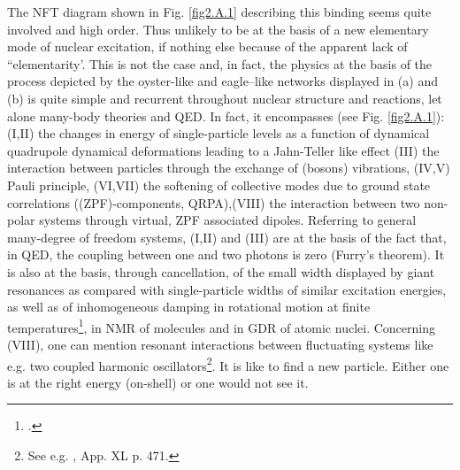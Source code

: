 \begin{subappendices}
The NFT diagram shown in Fig. \ref{fig2.A.1} describing this binding seems quite involved and high order. Thus unlikely to be at the basis of a new elementary mode of nuclear excitation, if nothing else because of the apparent lack of ``elementarity'. This is not the case and, in fact, the physics at the basis of the process depicted by the oyster-like and eagle--like networks displayed in (a) and (b) is quite simple and recurrent throughout nuclear structure and reactions, let alone many-body theories and QED. In fact, it encompasses (see Fig. \ref{fig2.A.1}): (I,II) the changes in energy of single-particle levels as a function of dynamical quadrupole dynamical deformations leading to a Jahn-Teller like effect (III) the interaction between particles through the exchange of (bosons) vibrations, (IV,V) Pauli principle, (VI,VII) the softening of collective modes due to ground state correlations ((ZPF)-components, QRPA),(VIII) the interaction between two non-polar systems through virtual, ZPF associated dipoles. Referring to general many-degree of freedom systems, (I,II) and (III) are at the basis of the fact that, in QED, the coupling between one and two photons is zero (Furry's theorem). It is also at the basis, through cancellation, of the small width displayed by giant resonances as compared with single-particle widths of similar excitation energies, as well as of inhomogeneous damping in rotational motion at finite temperatures\footnote{\cite{Broglia:87}.}, in NMR of molecules  and in GDR of atomic nuclei. Concerning (VIII), one can mention resonant interactions between fluctuating systems like e.g. two coupled harmonic oscillators\footnote{See e.g. \cite{Born:69}, App. XL p. 471.}. It is like to find a new particle. Either one is at the right energy (on-shell) or one would not see it.


\end{subappendices}
